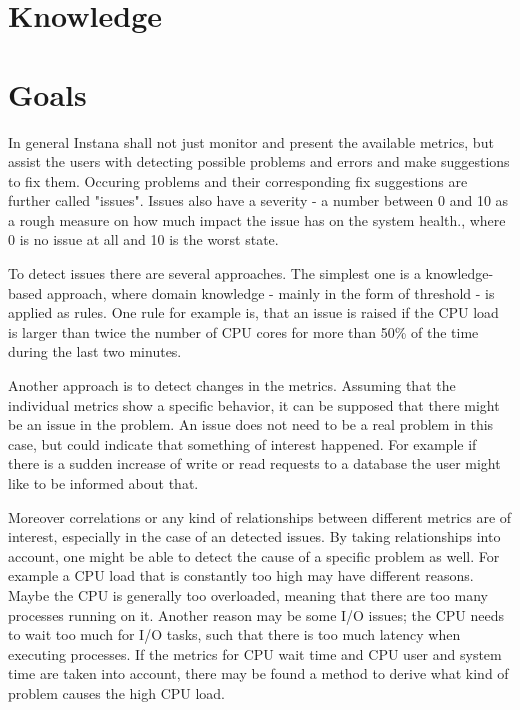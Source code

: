 \documentclass[]{article}
\begin{document}
\section{Knowledge}

\section{Goals}
In general Instana shall not just monitor and present the available metrics, but assist the users with detecting possible problems and errors and make suggestions to fix them.
Occuring problems and their corresponding fix suggestions are further called "issues".
Issues also have a severity - a number between 0 and 10 as a rough measure on how much impact the issue has on the system health., where 0 is no issue at all and 10 is the worst state.

To detect issues there are several approaches.
The simplest one is a knowledge-based approach, where domain knowledge - mainly in the form of threshold - is applied as rules.
One rule for example is, that an issue is raised if the CPU load is larger than twice the number of CPU cores for more than 50\% of the time during the last two minutes.

Another approach is to detect changes in the metrics.
Assuming that the individual metrics show a specific behavior, it can be supposed that there might be an issue in the problem.
An issue does not need to be a real problem in this case, but could indicate that something of interest happened.
For example if there is a sudden increase of write or read requests to a database the user might like to be informed about that.

Moreover correlations or any kind of relationships between different metrics are of interest, especially in the case of an detected issues.
By taking relationships into account, one might be able to detect the cause of a specific problem as well.
For example a CPU load that is constantly too high may have different reasons.
Maybe the CPU is generally too overloaded, meaning that there are too many processes running on it.
Another reason may be some I/O issues; the CPU needs to wait too much for I/O tasks, such that there is too much latency when executing processes.
If the  metrics for CPU wait time and CPU user and system time are taken into account, there may be found a method to derive what kind of problem causes the high CPU load.
\end{document}
